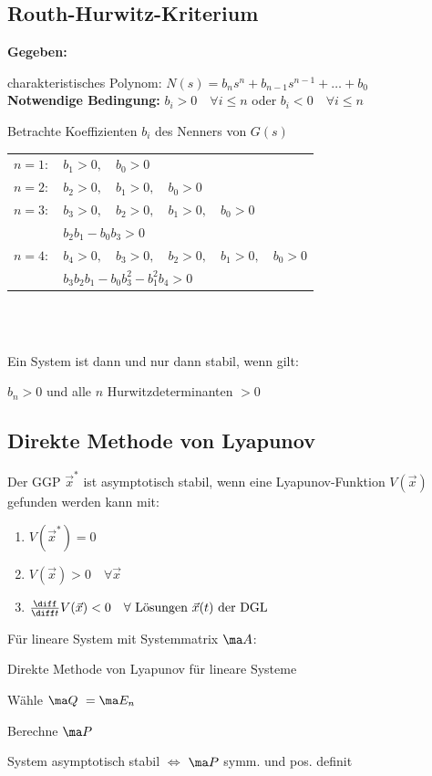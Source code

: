 \documentclass[german]{latex4ei/latex4ei_sheet}
\begin{document}
\begin{sectionbox}
\subsection{Routh-Hurwitz-Kriterium}

	\textbf{Gegeben:}

	charakteristisches Polynom:
	$N(s) = b_n s^n + b_{n-1} s^{n-1} + \ldots + b_0$ \\

	\textbf{Notwendige Bedingung:}
	$b_i > 0 \quad \forall i \le n$ oder $b_i < 0 \quad \forall i \le n$


	Betrachte Koeffizienten $b_i$ des Nenners von $G(s)$\\
	\begin{tabular}{ll}
	$n = 1:$ & $b_1 > 0,\quad b_0 > 0$\\
	$n = 2:$ & $b_2 >0,\quad b_1 > 0,\quad b_0 > 0$\\
	$n = 3:$ & $b_3 > 0,\quad b_2 > 0,\quad b_1 > 0,\quad b_0 > 0$\\
			 & $b_2 b_1 - b_0 b_3 > 0$\\
	$n = 4:$ & $b_4 > 0,\quad b_3 > 0, \quad b_2 > 0, \quad b_1 > 0,\quad b_0 > 0$\\
			 & $b_3 b_2 b_1 - b_0 b_3^2 - b_1^2 b_4 > 0$\\
	\end{tabular}
	\\ \\
	\begin{emphbox}
	Ein System ist dann und nur dann stabil, wenn gilt:

	$b_n > 0$ und  alle $n$ Hurwitzdeterminanten $> 0$
	\end{emphbox}
\end{sectionbox}
\begin{sectionbox}
\subsection{Direkte Methode von Lyapunov}
    Der GGP $\vec{x}^*$ ist asymptotisch stabil, wenn eine Lyapunov-Funktion $V(\vec{x})$ gefunden werden kann mit:
    \begin{enumerate}
    	\item $V(\vec{x}^*)=0$
    	\item $V(\vec{x})>0\quad\forall \vec{x}$
	    \item $\frac{\diff}{\diff t} V(\vec{x})<0 \quad \forall \text{ Lösungen } \vec{x}(t) \text{ der DGL}$


    \end{enumerate}
	Für lineare System mit Systemmatrix $\ma A$: \qquad {}\\

	\begin{cookbox}{Direkte Methode von Lyapunov für lineare Systeme}
		\item Wähle $\ma Q \ = \ma E_n$
		\item Berechne $\ma P$
		\item 	System asymptotisch stabil $\Longleftrightarrow$ $\ma P$ symm. und pos. definit
	\end{cookbox}
\end{sectionbox}
\end{document}
